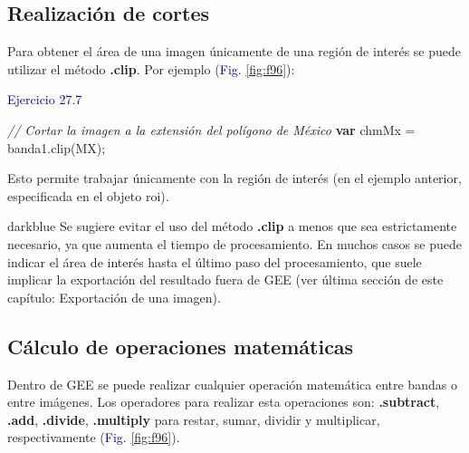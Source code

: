 \documentclass[
  12pt,
  letterpaper,
  twoside]{book}
\newenvironment{Shaded}{\begin{snugshade}}{\end{snugshade}}
\newcommand{\CommentTok}[1]{\textcolor[rgb]{0.24,0.58,0.00}{\textit{#1}}}
\newcommand{\ControlFlowTok}[1]{\textcolor[rgb]{0.00,0.00,0.00}{\textbf{#1}}}
\newcommand{\FunctionTok}[1]{\textcolor[rgb]{0.48,0.12,0.64}{#1}}
\newcommand{\NormalTok}[1]{#1}
\newcommand{\OperatorTok}[1]{\textcolor[rgb]{0.00,0.00,0.00}{#1}}
\newcommand\boldpurple[1]{\textcolor{darkpurple}{\textbf{#1}}}
\begin{document}
\hypertarget{realizaciuxf3n-de-cortes}{%
\subsection*{Realización de cortes}\label{realizaciuxf3n-de-cortes}}

Para obtener el área de una imagen únicamente de una región de interés se puede utilizar el método \boldpurple{.clip}. Por ejemplo (\textcolor{darkblue}{Fig.} \ref{fig:f96}):

\textcolor{darkblue}{Ejercicio 27.7}

\begin{Shaded}
\begin{Highlighting}[]
\CommentTok{// Cortar la imagen a la extensión del polígono de México}
\ControlFlowTok{var}\NormalTok{ chmMx }\OperatorTok{=}\NormalTok{ banda1}\OperatorTok{.}\FunctionTok{clip}\NormalTok{(MX)}\OperatorTok{;}
\end{Highlighting}
\end{Shaded}

Esto permite trabajar únicamente con la región de interés (en el ejemplo anterior, especificada en el objeto roi).

\begin{bluebox2}

\begin{awesomeblock}{5pt}{\faLightbulb}{darkblue}
Se sugiere evitar el uso del método \boldpurple{.clip} a menos que sea estrictamente necesario, ya que aumenta el tiempo de procesamiento. En muchos casos se puede indicar el área de interés hasta el último paso del procesamiento, que suele implicar la exportación del resultado fuera de GEE (ver última sección de este capítulo: Exportación de una imagen).

\end{awesomeblock}

\end{bluebox2}

\hypertarget{cuxe1lculo-de-operaciones-matemuxe1ticas}{%
\subsection*{Cálculo de operaciones matemáticas}\label{cuxe1lculo-de-operaciones-matemuxe1ticas}}

Dentro de GEE se puede realizar cualquier operación matemática entre bandas o entre imágenes. Los operadores para realizar esta operaciones son: \boldpurple{.subtract}, \boldpurple{.add}, \boldpurple{.divide}, \boldpurple{.multiply} para restar, sumar, dividir y multiplicar, respectivamente (\textcolor{darkblue}{Fig.} \ref{fig:f96}).
\end{document}
